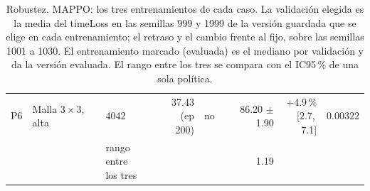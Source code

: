 \begin{table}[H]
\begin{tabular}{lllrlrrr}
P6 & \makecell[l]{Malla $3 \times 3$,\\{}alta} & 4042 & \makecell[r]{37.43\\{}(ep 200)} & no & \makecell[r]{86.20\\{}$\pm$ 1.90} & \makecell[r]{+4.9\,\%\\{}[2.7,\,7.1]} & 0.00322 \\
 & & \makecell[l]{rango entre\\{}los tres} & & & 1.19 & & \\
\bottomrule
\end{tabular}
\caption[Robustez: entrenamientos de MAPPO]{Robustez. MAPPO: los tres entrenamientos de cada caso. La validación elegida es la media del timeLoss en las semillas 999 y 1999 de la versión guardada que se elige en cada entrenamiento; el retraso y el cambio frente al fijo, sobre las semillas 1001 a 1030. El entrenamiento marcado (evaluada) es el mediano por validación y da la versión evaluada. El rango entre los tres se compara con el IC95\,\% de una sola política.}
\label{tab:robustez-veredicto-bases-mappo}
\end{table}

